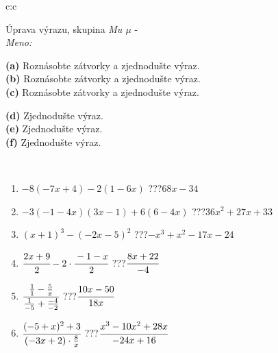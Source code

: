 \documentclass[10pt]{report}
\begin{document}
\newpage
\thispagestyle{empty}
\begin{tabular}{c:c}
\begin{minipage}[c][104.5mm][t]{0.5\linewidth}
\begin{center}
\vspace{7mm}
{\huge Úprava výrazu, skupina \textit{Mu $\mu$} -}\\[5mm]
\textit{Meno:}\phantom{xxxxxxxxxxxxxxxxxxxxxxxxxxxxxxxxxxxxxxxxxxxxxxxxxxxxxxxxxxxxxxxxx}\\[5mm]
\begin{minipage}{0.95\linewidth}
\begin{center}
{\small \begin{minipage}{0.6\textwidth}
\textbf{(a)} Roznásobte zátvorky a zjednodušte výraz. \\[1mm]
\textbf{(b)} Roznásobte zátvorky a zjednodušte výraz. \\[1mm]
\textbf{(c)} Roznásobte zátvorky a zjednodušte výraz.
\end{minipage} \begin{minipage}{0.39\textwidth}
\textbf{(d)} Zjednodušte výraz. \\[1mm]
\textbf{(e)} Zjednodušte výraz. \\[1mm]
\textbf{(f)} Zjednodušte výraz.
\end{minipage}
}
\end{center}
\end{minipage}
\\[4mm]
\begin{minipage}{0.79\linewidth}
\begin{center}
\begin{varwidth}{\linewidth}
\begin{enumerate}
\normalsize
\item $-8(-7x+4)-2(1-6x)$\quad \dotfill\; ???\;\dotfill \quad $68x-34$
\item $-3(-1-4x)(3x-1)+6(6-4x)$\quad \dotfill\; ???\;\dotfill \quad $36x^2+27x+33$
\item $(x+1)^3-(-2x-5)^2$\quad \dotfill\; ???\;\dotfill \quad $-x^3+x^2-17x-24$
\item $\cfrac{2x+9}{2}-2\cdot\cfrac{-1-x}{2}$\quad \dotfill\; ???\;\dotfill \quad $\cfrac{8x+22}{-4}$
\item $\cfrac{\frac{1}{1}-\frac{5}{x}}{\frac{1}{-5}+\frac{-4}{-2}}$\quad \dotfill\; ???\;\dotfill \quad $\cfrac{10x-50}{18x}$
\item $\cfrac{(-5+x)^2+3}{(-3x+2)\cdot\frac{8}{x}}$\quad \dotfill\; ???\;\dotfill \quad $\cfrac{x^3-10x^2+28x}{-24x+16}$

\end{enumerate}
\end{varwidth}
\end{center}
\end{minipage}
\end{center}
\end{minipage}
\end{tabular}
\end{document}
